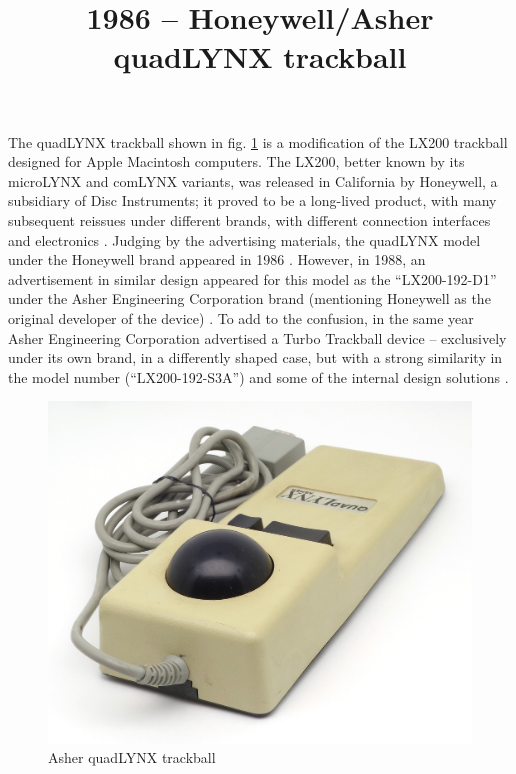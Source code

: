 \documentclass[11pt, a4paper]{article}
\begin{document}
\title{1986 -- Honeywell/Asher quadLYNX trackball}
\date{}
\maketitle
{}
The quadLYNX trackball shown in fig. \ref{fig:quadLYNXPic} is a modification of the LX200 trackball designed for Apple Macintosh computers. The LX200, better known by its microLYNX and comLYNX variants, was released in California by Honeywell, a subsidiary of Disc Instruments; it proved to be a long-lived product, with many subsequent reissues under different brands, with different connection interfaces and electronics \cite{lx200}. Judging by the advertising materials, the quadLYNX model under the Honeywell brand appeared in 1986 \cite{honeywell}. However, in 1988, an advertisement in similar design appeared for this model as the ``LX200-192-D1'' under the Asher Engineering Corporation brand (mentioning Honeywell as the original developer of the device) \cite{asher}. To add to the confusion, in the same year Asher Engineering Corporation advertised a Turbo Trackball device -- exclusively under its own brand, in a differently shaped case, but with a strong similarity in the model number (``LX200-192-S3A'') and some of the internal design solutions \cite{turbo}.

\begin{figure}[h]
    \centering
    \includegraphics[scale=0.78]{1986_honeywell_asher_quadlynx_trackball/pic_30.jpg}
    \caption{Asher quadLYNX trackball}
    \label{fig:quadLYNXPic}
\end{figure}
\end{document}
